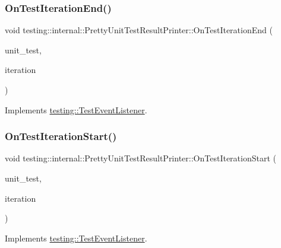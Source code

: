 \subsubsection{\texorpdfstring{OnTestIterationEnd()}{OnTestIterationEnd()}}
{\footnotesize\ttfamily void testing\+::internal\+::\+Pretty\+Unit\+Test\+Result\+Printer\+::\+On\+Test\+Iteration\+End (\begin{DoxyParamCaption}\item[{const \mbox{\hyperlink{classtesting_1_1UnitTest}{Unit\+Test}} \&}]{unit\+\_\+test,  }\item[{int}]{iteration }\end{DoxyParamCaption})\hspace{0.3cm}{\ttfamily [virtual]}}



Implements \mbox{\hyperlink{classtesting_1_1TestEventListener_a550fdb3e55726e4cefa09f5697941425}{testing\+::\+Test\+Event\+Listener}}.

\mbox{\label{classtesting_1_1internal_1_1PrettyUnitTestResultPrinter_abdba10a8c97e272ab4cee97cb652c957}} 
\subsubsection{\texorpdfstring{OnTestIterationStart()}{OnTestIterationStart()}}
{\footnotesize\ttfamily void testing\+::internal\+::\+Pretty\+Unit\+Test\+Result\+Printer\+::\+On\+Test\+Iteration\+Start (\begin{DoxyParamCaption}\item[{const \mbox{\hyperlink{classtesting_1_1UnitTest}{Unit\+Test}} \&}]{unit\+\_\+test,  }\item[{int}]{iteration }\end{DoxyParamCaption})\hspace{0.3cm}{\ttfamily [virtual]}}



Implements \mbox{\hyperlink{classtesting_1_1TestEventListener_a60cc09b7907cb329d152eb5e7133bdeb}{testing\+::\+Test\+Event\+Listener}}.

\mbox{\label{classtesting_1_1internal_1_1PrettyUnitTestResultPrinter_a7589e8df7485349498a3a81bf16e2f68}} 
